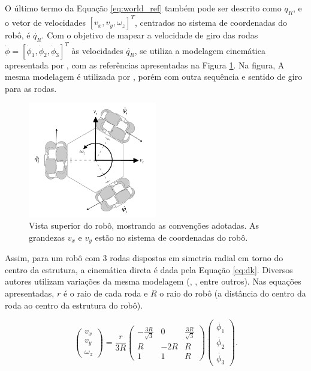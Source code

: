 O último termo da Equação \ref{eq:world_ref} também pode ser descrito como $q_R$, e o vetor de velocidades $[v_x, v_y, \omega_z]^T$, centrados no sistema de coordenadas do robô, é $\dot{q_R}$. Com o objetivo de mapear a velocidade de giro das rodas $\dot{\phi} = [\dot{\phi}_1, \dot{\phi}_2, \dot{\phi}_3]^T$ às velocidades $\dot{q_R}$, se utiliza a modelagem cinemática apresentada por \cite{siegwart2011introduction}, com as referências apresentadas na Figura \ref{fig:robo_vel}. Na figura,  A mesma modelagem é utilizada por \cite{ritter2016modelagem}, porém com outra sequência e sentido de giro para as rodas.

\begin{figure}[h]
  \centering
  \includegraphics[width = 0.5\textwidth]{imagens/robot_vel4}
  \caption{Vista superior do robô, mostrando as convenções adotadas. As grandezas $v_x$ e $v_y$ estão no sistema de coordenadas do robô.}
  \label{fig:robo_vel}
\end{figure}

Assim, para um robô com 3 rodas dispostas em simetria radial em torno do centro da estrutura, a cinemática direta é dada pela Equação \ref{eq:dk}. Diversos autores utilizam variações da mesma modelagem (\cite{rojas2006holonomic}, \cite{pin1994new}, entre outros). Nas equações apresentadas, $r$ é o raio de cada roda e $R$ o raio do robô (a distância do centro da roda ao centro da estrutura do robô).

\begin{equation}
  \begin{pmatrix}
    v_x \\
    v_y \\
    \omega_z
  \end{pmatrix}
  =
  \frac{r}{3R}
  \begin{pmatrix}
    -\frac{3R}{\sqrt{3}} & 0   & \frac{3R}{\sqrt{3}} \\
    R                    & -2R & R                   \\
    1                    & 1   & R
  \end{pmatrix}
  \begin{pmatrix}
    \dot{\phi_1} \\
    \dot{\phi_2} \\
    \dot{\phi_3}
  \end{pmatrix}.
  \label{eq:dk}
\end{equation}

